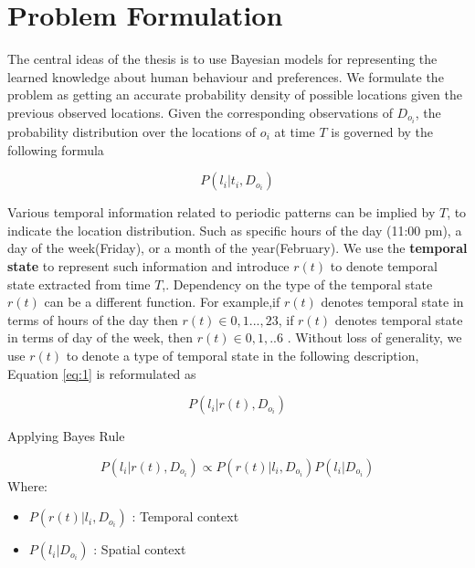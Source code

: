 
\chapter{Problem Formulation}
\label{sec:Problem formulation}

The central ideas of the thesis is to use Bayesian models for representing the learned knowledge about human behaviour and preferences. We formulate the problem as getting an accurate probability density of possible locations given the previous observed locations. Given the corresponding observations of $D_{o_i}$, the probability distribution over the locations of $o_i$ at time $T$ is governed by the following formula 

    \begin{equation} \label{eq:1}
	    P(l_i | t_i, D_{o_i})
    \end{equation}

   Various temporal information related to periodic patterns can be implied by $T$, to indicate the location distribution. Such as specific hours of the day (11:00 pm), a day of the week(Friday), or a month of the year(February). We use the \textbf{temporal state} to represent such information and introduce $r(t)$ to denote temporal state extracted from time $T$,.  Dependency on the type of the temporal state $r(t)$ can be a different function. For example,if $r(t)$ denotes temporal state in terms of hours of the day then $r(t) \in {0,1 ... , 23}$, if $r(t)$ denotes temporal state in terms of day of the week, then $r(t) \in {0,1, .. 6}$ . Without loss of generality, we use $r(t)$ to denote a type of temporal state in the following description, Equation \ref{eq:1} is reformulated as 
    
    \begin{equation}
	    P( l_i | r(t), D_{o_i})
    \end{equation}
    
    Applying Bayes Rule
    
    \begin{equation}\label{eq:3}
	P( l_i | r(t), D_{o_i}) \propto P(r(t) | l_i, D_{o_i})  P(l_i | D_{o_i})
    \end{equation}
    Where:
    \begin{itemize}[label=]
    \item $P(r(t) | l_i, D_{o_i})$ : Temporal context 
    \item $P(l_i | D_{o_i})$ : Spatial context
    \end{itemize}
    
